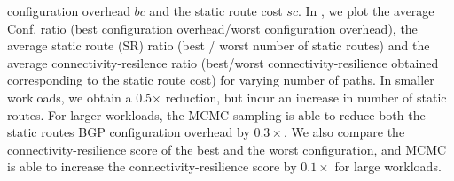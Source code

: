 configuration overhead $bc$ and the static route cost 
$sc$. In , we plot the average Conf. ratio 
(best configuration overhead/worst configuration overhead), 
the average static route (SR) ratio 
(best / worst number of static routes) and the average 
connectivity-resilence ratio (best/worst connectivity-resilience obtained corresponding to the 
static route cost)
for varying number of paths. 
In smaller workloads, we obtain a 0.5$\times$ reduction, 
but incur an increase in number of static routes. For 
larger workloads, the MCMC sampling is able to
reduce both the static routes 
BGP configuration overhead by $0.3\times$. We also
compare the connectivity-resilience score 
of the best and the worst configuration, and MCMC
is able to increase the connectivity-resilience score 
by $0.1\times$ for large workloads.



